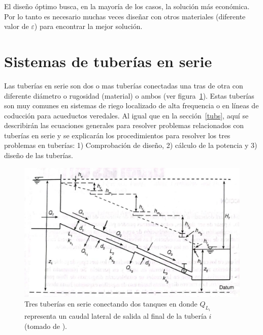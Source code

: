 \documentclass[10pt, oneside]{article}
\begin{document}
El dise\~no \'optimo busca, en la mayor\'ia de los casos, la soluci\'on m\'as econ\'omica. Por lo tanto es necesario muchas veces dise\~nar con otros materiales (diferente valor de $\varepsilon$) para encontrar  la mejor soluci\'on.
 

\section{Sistemas de tuber\'ias en serie} 
Las tuber\'ias en serie son dos o mas tuber\'ias conectadas una tras de otra con diferente di\'ametro o rugosidad (material) o ambos (ver figura~\ref{ttuse}). Estas tuber\'ias son muy comunes en sistemas de riego localizado de alta frequencia o en l\'ineas de coducci\'on para acueductos veredales. Al igual que en la secci\'on~\ref{tubs}, aqu\'i se describir\'an las ecuaciones generales para resolver problemas relacionados con tuber\'ias en serie y se explicar\'an los procedimientos para resolver los tres problemas en tuber\'ias: 1) Comprobaci\'on de dise\~no, 2) c\'alculo de la potencia y 3) dise\~no de las tuber\'ias.

\begin{figure}[h]
\centering
\includegraphics[width=12cm]{./figs/comp2.jpeg}
\caption{Tres tuber\'ias en serie conectando dos tanques en donde $Q_{L_i}$ representa un caudal lateral de salida al final de la tuber\'ia $i$ (tomado de \cite{saldarriaga}).} 
\label{ttuse}
\end{figure}
\end{document}
